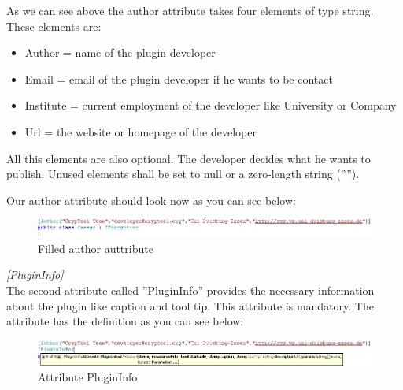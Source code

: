 As we can see above the author attribute takes four elements of type string. These elements are:
\begin{itemize}
	\item Author = name of the plugin developer
	\item Email = email of the plugin developer if he wants to be contact
	\item Institute = current employment of the developer like University or Company
	\item Url = the website or homepage of the developer
\end{itemize}
All this elements are also optional. The developer decides what he wants to publish. Unused elements shall be set to null or a zero-length string ('''').

Our author attribute should look now as you can see below:
\begin{figure}[h!]
	\centering
		\includegraphics[width=1.00\textwidth]{figures/attribute_author_filled.jpg}
	\caption{Filled author auttribute}
	\label{fig:attribute_author_filled}
\end{figure}


\textit{[PluginInfo]}\\
The second attribute called ''PluginInfo'' provides the necessary information about the plugin like caption and tool tip. This attribute is mandatory. The attribute has the definition as you can see below:
\begin{figure}[h]
	\centering
		\includegraphics[width=1.00\textwidth]{figures/attribute_plugininfo.jpg}
	\caption{Attribute PluginInfo}
	\label{fig:attribute_plugininfo}
\end{figure}

